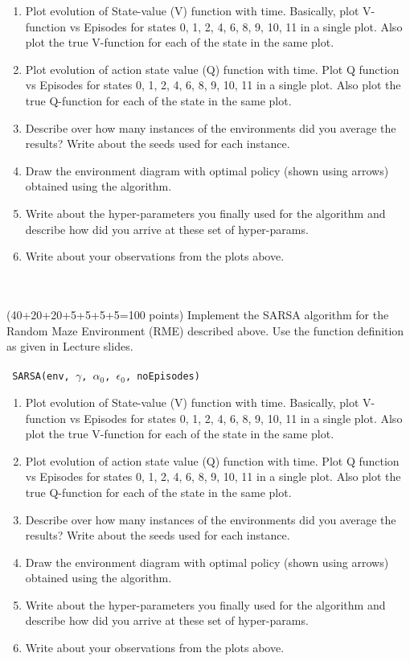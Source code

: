 \documentclass[a4 paper]{article}
\numberwithin{equation}{section}
\newcommand{\problem}[2]{~\\\fbox{\textbf{Problem #1}}\\(#2 points)\newline\newline}
\newcommand{\0}{\mathbf{0}}
\begin{document}
\begin{enumerate}[label=(\alph*)]
\item Plot evolution of State-value (V) function with time. Basically, plot V-function vs Episodes for states 0, 1, 2, 4, 6, 8,  9, 10, 11 in a single plot. Also plot the true V-function for each of the state in the same plot. 
\item Plot evolution of action state value (Q) function with time. Plot Q function vs Episodes for states 0, 1, 2, 4, 6, 8, 9, 10, 11 in a single plot. Also plot the true Q-function for each of the state in the same plot.  
\item Describe over how many instances of the environments did you average the results? Write about the seeds used for each instance. 
\item Draw the environment diagram with optimal policy (shown using arrows) obtained using the algorithm.  
\item Write about the hyper-parameters you finally used for the algorithm and describe how did you arrive at these set of hyper-params. 
\item Write about your observations from the plots above.
\end{enumerate}

\problem{2: SARSA (TD Control)}{40+20+20+5+5+5+5=100}
Implement the SARSA algorithm for the Random Maze Environment (RME) described above. Use the function definition as given in Lecture slides. \\
\\
\texttt{
SARSA(env, $\gamma$, $\alpha_{0}$, $\epsilon_{0}$, noEpisodes)
}

\begin{enumerate}[label=(\alph*)]
\item Plot evolution of State-value (V) function with time. Basically, plot V-function vs Episodes for states 0, 1, 2, 4, 6, 8,  9, 10, 11 in a single plot. Also plot the true V-function for each of the state in the same plot. 
\item Plot evolution of action state value (Q) function with time. Plot Q function vs Episodes for states 0, 1, 2, 4, 6, 8, 9, 10, 11 in a single plot. Also plot the true Q-function for each of the state in the same plot.  
\item Describe over how many instances of the environments did you average the results? Write about the seeds used for each instance. 
\item Draw the environment diagram with optimal policy (shown using arrows) obtained using the algorithm.  
\item Write about the hyper-parameters you finally used for the algorithm and describe how did you arrive at these set of hyper-params. 
\item Write about your observations from the plots above.
\end{enumerate}
\end{document}
